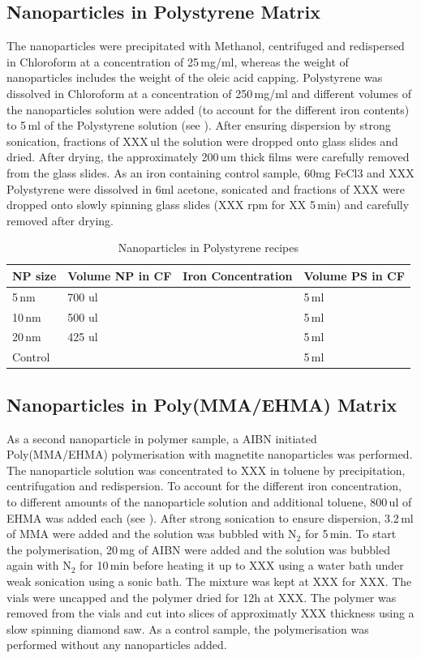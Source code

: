 \subsection{Nanoparticles in Polystyrene Matrix}
The nanoparticles were precipitated with Methanol, centrifuged and redispersed in Chloroform at a concentration of 25\,mg/ml, whereas the weight of nanoparticles includes the weight of the oleic acid capping. Polystyrene was dissolved in Chloroform at a concentration of 250\,mg/ml and different volumes of the nanoparticles solution were added (to account for the different iron contents) to 5\,ml of the Polystyrene solution (see ). After ensuring dispersion by strong sonication, fractions of XXX\,ul the solution were dropped onto glass slides and dried. After drying, the approximately 200\,um thick films were carefully removed from the glass slides.
As an iron containing control sample, 60mg FeCl3 and XXX Polystyrene were dissolved in 6ml acetone, sonicated and  fractions of XXX were dropped onto slowly spinning glass slides (XXX rpm for XX 5\,min) and carefully removed after drying.
\begin{table}[tp]
	\centering
	\caption{Nanoparticles in Polystyrene recipes}
	\label{tab:samplePS}
	\begin{tabular}{llll}
		\hline
	NP size&   Volume NP in CF &  Iron Concentration &Volume PS in CF    \\
		\hline
	  5\,nm&700 ul & & 5\,ml  \\  
	   10\,nm&  500 ul& &5\,ml  \\    
	   20\,nm &  425 ul& &5\,ml  \\  
	   	Control   &  & &5\,ml  \\  
		\hline
	\end{tabular}
\end{table}

\subsection{Nanoparticles in Poly(MMA/EHMA)  Matrix}
As a second nanoparticle in polymer sample, a AIBN initiated Poly(MMA/EHMA) polymerisation with magnetite nanoparticles was performed. 
The nanoparticle solution was concentrated to XXX in toluene by precipitation, centrifugation and redispersion. To account for the different iron concentration, to different amounts of the nanoparticle solution and additional toluene, 800\,ul of EHMA was added each (see ). After strong sonication to ensure dispersion, 3.2\,ml of MMA were added and the solution was bubbled with N$_2$ for 5\,min. To start the polymerisation, 20\,mg of AIBN were added and the solution was bubbled again with N$_2$  for 10\,min before heating it up to XXX using a water bath under weak sonication using a sonic bath. The mixture was kept at XXX for XXX.
The vials were uncapped and the polymer dried for 12h at XXX. The polymer was removed from the vials and cut into slices of approximatly XXX thickness using a slow spinning diamond saw.
As a control sample, the polymerisation was performed without any nanoparticles added.


